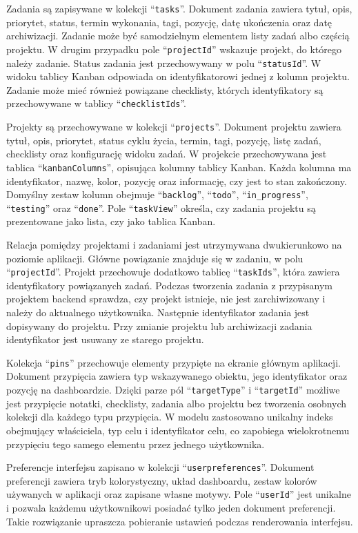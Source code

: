 \documentclass[12pt,a4paper,twoside]{report}
\begin{document}
Zadania są zapisywane w kolekcji ``\texttt{tasks}''. Dokument zadania zawiera tytuł, opis, priorytet, status, termin wykonania, tagi, pozycję, datę ukończenia oraz datę archiwizacji. Zadanie może być samodzielnym elementem listy zadań albo częścią projektu. W drugim przypadku pole ``\texttt{projectId}'' wskazuje projekt, do którego należy zadanie. Status zadania jest przechowywany w polu ``\texttt{statusId}''. W widoku tablicy Kanban odpowiada on identyfikatorowi jednej z kolumn projektu. Zadanie może mieć również powiązane checklisty, których identyfikatory są przechowywane w tablicy ``\texttt{checklistIds}''.

Projekty są przechowywane w kolekcji ``\texttt{projects}''. Dokument projektu zawiera tytuł, opis, priorytet, status cyklu życia, termin, tagi, pozycję, listę zadań, checklisty oraz konfigurację widoku zadań. W projekcie przechowywana jest tablica ``\texttt{kanbanColumns}'', opisująca kolumny tablicy Kanban. Każda kolumna ma identyfikator, nazwę, kolor, pozycję oraz informację, czy jest to stan zakończony. Domyślny zestaw kolumn obejmuje ``\texttt{backlog}'', ``\texttt{todo}'', ``\texttt{in\_progress}'', ``\texttt{testing}'' oraz ``\texttt{done}''. Pole ``\texttt{taskView}'' określa, czy zadania projektu są prezentowane jako lista, czy jako tablica Kanban. 

Relacja pomiędzy projektami i zadaniami jest utrzymywana dwukierunkowo na poziomie aplikacji. Główne powiązanie znajduje się w zadaniu, w polu ``\texttt{projectId}''. Projekt przechowuje dodatkowo tablicę ``\texttt{taskIds}'', która zawiera identyfikatory powiązanych zadań. Podczas tworzenia zadania z przypisanym projektem backend sprawdza, czy projekt istnieje, nie jest zarchiwizowany i należy do aktualnego użytkownika. Następnie identyfikator zadania jest dopisywany do projektu. Przy zmianie projektu lub archiwizacji zadania identyfikator jest usuwany ze starego projektu.

Kolekcja ``\texttt{pins}'' przechowuje elementy przypięte na ekranie głównym aplikacji. Dokument przypięcia zawiera typ wskazywanego obiektu, jego identyfikator oraz pozycję na dashboardzie. Dzięki parze pól ``\texttt{targetType}'' i ``\texttt{targetId}'' możliwe jest przypięcie notatki, checklisty, zadania albo projektu bez tworzenia osobnych kolekcji dla każdego typu przypięcia. W modelu zastosowano unikalny indeks obejmujący właściciela, typ celu i identyfikator celu, co zapobiega wielokrotnemu przypięciu tego samego elementu przez jednego użytkownika.

Preferencje interfejsu zapisano w kolekcji ``\texttt{userpreferences}''. Dokument preferencji zawiera tryb kolorystyczny, układ dashboardu, zestaw kolorów używanych w aplikacji oraz zapisane własne motywy. Pole ``\texttt{userId}'' jest unikalne i pozwala każdemu użytkownikowi posiadać tylko jeden dokument preferencji. Takie rozwiązanie upraszcza pobieranie ustawień podczas renderowania interfejsu.
\end{document}
